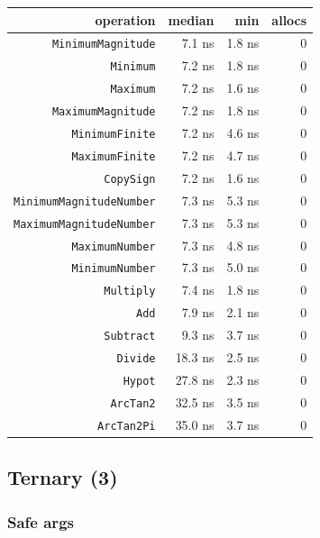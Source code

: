 \begin{table}[h]
\centering
\begin{tabulary}{\linewidth}{R R R R}
\toprule
operation & median & min & allocs \\
\toprule
\texttt{MinimumMagnitude} & 7.1 ns & 1.8 ns & 0 \\
\texttt{Minimum} & 7.2 ns & 1.8 ns & 0 \\
\texttt{Maximum} & 7.2 ns & 1.6 ns & 0 \\
\texttt{MaximumMagnitude} & 7.2 ns & 1.8 ns & 0 \\
\texttt{MinimumFinite} & 7.2 ns & 4.6 ns & 0 \\
\texttt{MaximumFinite} & 7.2 ns & 4.7 ns & 0 \\
\texttt{CopySign} & 7.2 ns & 1.6 ns & 0 \\
\texttt{MinimumMagnitudeNumber} & 7.3 ns & 5.3 ns & 0 \\
\texttt{MaximumMagnitudeNumber} & 7.3 ns & 5.3 ns & 0 \\
\texttt{MaximumNumber} & 7.3 ns & 4.8 ns & 0 \\
\texttt{MinimumNumber} & 7.3 ns & 5.0 ns & 0 \\
\texttt{Multiply} & 7.4 ns & 1.8 ns & 0 \\
\texttt{Add} & 7.9 ns & 2.1 ns & 0 \\
\texttt{Subtract} & 9.3 ns & 3.7 ns & 0 \\
\texttt{Divide} & 18.3 ns & 2.5 ns & 0 \\
\texttt{Hypot} & 27.8 ns & 2.3 ns & 0 \\
\texttt{ArcTan2} & 32.5 ns & 3.5 ns & 0 \\
\texttt{ArcTan2Pi} & 35.0 ns & 3.7 ns & 0 \\
\bottomrule
\end{tabulary}

\end{table}



\subsection{Ternary (3)}



\label{1836852574804533888}{}


\subsubsection{Safe args}



